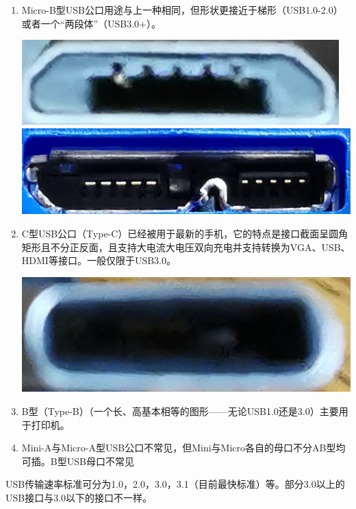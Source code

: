 \begin{enumerate}
\begin{center}
\end{center}
\item Micro-B型USB公口用途与上一种相同，但形状更接近于梯形（USB1.0-2.0）或者一个“两段体”（USB3.0+）。
\begin{center}
\includegraphics[scale=0.2]{pic/Micro-USB-B-1}\\\includegraphics[scale=0.1]{pic/Micro-USB-B-2}
\end{center}
\item C型USB公口（Type-C）已经被用于最新的手机，它的特点是接口截面呈圆角矩形且不分正反面，且支持大电流大电压双向充电并支持转换为VGA、USB、HDMI等接口。一般仅限于USB3.0。
\begin{center}
	\includegraphics[scale=0.15]{pic/C-USB-1}
\end{center}
\item B型（Type-B）（一个长、高基本相等的图形——无论USB1.0还是3.0）主要用于打印机。
\item Mini-A与Micro-A型USB公口不常见，但Mini与Micro各自的母口不分AB型均可插。B型USB母口不常见
\end{enumerate}
USB传输速率标准可分为1.0，2.0，3.0，3.1（目前最快标准）等。部分3.0以上的USB接口与3.0以下的接口不一样。
